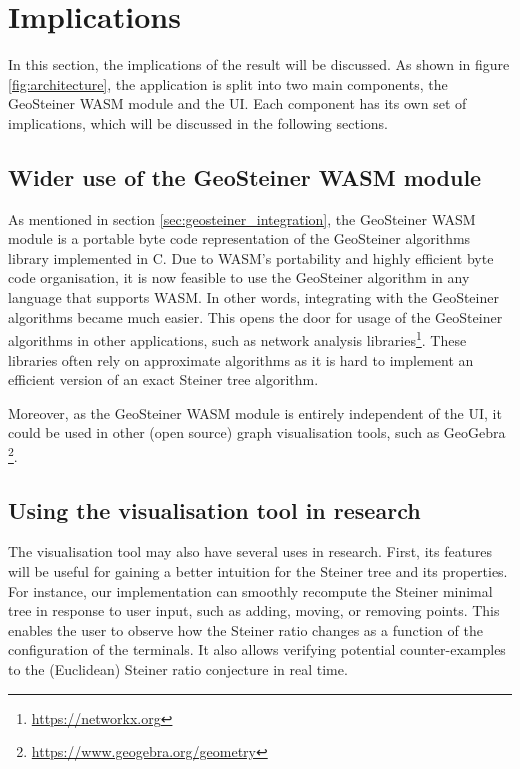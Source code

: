 \documentclass{l4proj}
\begin{document}



\section{Implications}
\label{sec:implications}
In this section, the implications of the result will be discussed. As shown in figure \ref{fig:architecture}, the application is split into two main components, the GeoSteiner WASM module and the UI. Each component has its own set of implications, which will be discussed in the following sections.
\subsection{Wider use of the GeoSteiner WASM module}

As mentioned in section \ref{sec:geosteiner_integration}, the GeoSteiner WASM module is a portable byte code representation of the GeoSteiner algorithms library implemented in C. Due to WASM's portability and highly efficient byte code organisation, it is now feasible to use the GeoSteiner algorithm in any language that supports WASM. In other words, integrating with the GeoSteiner algorithms became much easier. This opens the door for usage of the GeoSteiner algorithms in other applications, such as network analysis libraries\footnote[5]{\url{https://networkx.org}}. These libraries often rely on approximate algorithms as it is hard to implement an efficient version of an exact Steiner tree algorithm.

Moreover, as the GeoSteiner WASM module is entirely independent of the UI, it could be used in other (open source) graph visualisation tools, such as GeoGebra \footnote[6]{\url{https://www.geogebra.org/geometry}}.
\subsection{Using the visualisation tool in research}
The visualisation tool may also have several uses in research. First, its features will be useful for gaining a better intuition for the Steiner tree and its properties. For instance, our implementation can smoothly recompute the Steiner minimal tree in response to user input, such as adding, moving, or removing points. This enables the user to observe how the Steiner ratio changes as a function of the configuration of the terminals. It also allows verifying potential counter-examples to the (Euclidean) Steiner ratio conjecture in real time.
\end{document}
